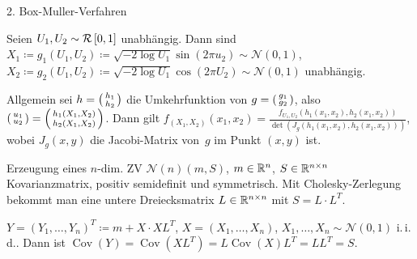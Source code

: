 \documentclass{cheat-sheet}
\newcommand{\iid}{i.\,i.\,d.} %
\newcommand{\Uniform}{\mathcal{R}} %
\DeclareMathOperator{\cov}{Cov} %
\newcommand{\Normal}{\mathcal{N}} %
\begin{document}

2. Box-Muller-Verfahren

Seien $U_1, U_2 \sim \Uniform \cinterval{0}{1}$ unabhängig.
Dann sind $X_1 \coloneqq g_1(U_1, U_2) \coloneqq \sqrt{- 2 \log U_1} \sin(2 \pi u_2) \sim \Normal(0, 1)$, $X_2 \coloneqq g_2(U_1, U_2) \coloneqq \sqrt{- 2 \log U_1} \cos(2 \pi U_2) \sim \Normal(0, 1)$ unabhängig.

Allgemein sei $h = \begin{psmallmatrix} h_1 \\ h_2 \end{psmallmatrix}$ die Umkehrfunktion von $g = \begin{psmallmatrix}
  g_1 \\ g_2
\end{psmallmatrix}$, also $\begin{psmallmatrix}
  u_1 \\ u_2
\end{psmallmatrix} = \begin{psmallmatrix}
  h_1(X_1, X_2) \\ h_2(X_1, X_2)
\end{psmallmatrix}$.
Dann gilt $f_{(X_1, X_2)}(x_1, x_2) = \frac{f_{U_1, U_2}(h_1(x_1, x_2), h_2(x_1, x_2))}{\det(J_g (h_1(x_1, x_2), h_2(x_1, x_2)))}$,
wobei $J_g (x, y)$ die Jacobi-Matrix von~$g$ im Punkt $(x, y)$ ist.


Erzeugung eines $n$-dim. ZV $\Normal(n)(m, S)$, $m \in \mathbb{R}^n$, $S \in \mathbb{R}^{n \times n}$ Kovarianzmatrix, positiv semidefinit und symmetrisch.
Mit Cholesky-Zerlegung bekommt man eine untere Dreiecksmatrix $L \in \mathbb{R}^{n \times n}$ mit $S = L \cdot L^T$.

$Y = (Y_1, \ldots, Y_n)^T \coloneqq m + X \cdot X L^T$, $X = (X_1, \ldots, X_n)$, $X_1, \ldots, X_n \sim \Normal(0, 1)$ \iid{}.
Dann ist $\cov(Y) = \cov(X L^T) = L \cov(X) L^T = L L^T = S$.
\end{document}
